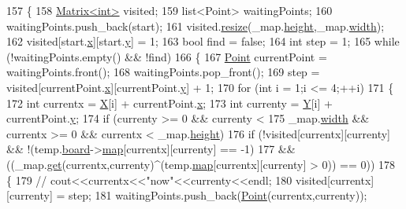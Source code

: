 \begin{DoxyCode}
157 \{
158     \hyperlink{classMatrix}{Matrix<int>} visited;
159     list<Point> waitingPoints;
160     waitingPoints.push\_back(start);
161     visited.\hyperlink{classMatrix_a15ce96c8af4c7a982c2c10b96f29cea1}{resize}(\_map.\hyperlink{classBitMatrix_a3b7a1be96313cacfd3b2a08661dd919c}{height},\_map.\hyperlink{classBitMatrix_ac271de23ac5446a0a75ee457a385d882}{width});
162     visited[start.\hyperlink{classPoint_a8c779e11e694b20e0946105a9f5de842}{x}][start.\hyperlink{classPoint_a2e1b5fb2b2a83571f5c0bc0f66a73cf7}{y}] = 1;
163     \textcolor{keywordtype}{bool} find = \textcolor{keyword}{false};
164     \textcolor{keywordtype}{int} step = 1;
165     \textcolor{keywordflow}{while} (!waitingPoints.empty() && !find)
166     \{
167         \hyperlink{classPoint}{Point} currentPoint = waitingPoints.front();
168         waitingPoints.pop\_front();
169         step = visited[currentPoint.\hyperlink{classPoint_a8c779e11e694b20e0946105a9f5de842}{x}][currentPoint.\hyperlink{classPoint_a2e1b5fb2b2a83571f5c0bc0f66a73cf7}{y}] + 1;
170         \textcolor{keywordflow}{for} (\textcolor{keywordtype}{int} i = 1;i <= 4;++i)
171         \{
172             \textcolor{keywordtype}{int} currentx = \hyperlink{CleverOptimizie_8cpp_a34adaf40bb2f109e151ba28ccc73c677}{X}[i] + currentPoint.\hyperlink{classPoint_a8c779e11e694b20e0946105a9f5de842}{x};
173             \textcolor{keywordtype}{int} currenty = \hyperlink{CleverOptimizie_8cpp_a86f15c23d2ab23bfebe784c368885663}{Y}[i] + currentPoint.\hyperlink{classPoint_a2e1b5fb2b2a83571f5c0bc0f66a73cf7}{y};
174                 \textcolor{keywordflow}{if} (currenty >= 0 && currenty < 
175                     \_map.\hyperlink{classBitMatrix_ac271de23ac5446a0a75ee457a385d882}{width} && currentx >= 0 && currentx < \_map.\hyperlink{classBitMatrix_a3b7a1be96313cacfd3b2a08661dd919c}{height})
176                 \textcolor{keywordflow}{if} (!visited[currentx][currenty] && !(temp.\hyperlink{classSolution_ac4f88cd3aa0713e8900f33eb9f1f15bf}{board}->\hyperlink{classBoard_a191ff45df9151b8fee0c32877f582165}{map}[currentx][currenty] == -1) 
177                     && ((\_map.\hyperlink{classBitMatrix_ad19d1045b54ccc8a99d70d38305b4ca6}{get}(currentx,currenty)^(temp.\hyperlink{classSolution_ae89ccd74484f2c87afa05b16f8ee5bf6}{map}[currentx][currenty] > 0)) == 0))
178                 \{
179                     \textcolor{comment}{// cout<<currentx<<"now"<<currenty<<endl;}
180                     visited[currentx][currenty] = step;
181                     waitingPoints.push\_back(\hyperlink{classPoint}{Point}(currentx,currenty));

\end{DoxyCode}
